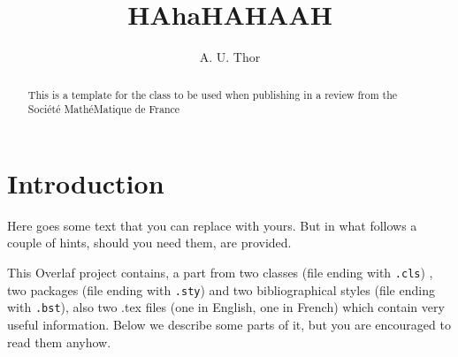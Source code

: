 \documentclass[11pt,english]{smfart}
\title[FakeModularForm]{HAhaHAHAAH}%
\author[A.T.]{A. U. Thor}%
\theoremstyle{definition}
\theoremstyle{remark}
\begin{document}
\begin{abstract}
This is a template for the class to be used when publishing in a review from the Soci\'et\'e Ma\-th\'e\-Ma\-ti\-que de France
\end{abstract}


\maketitle

\tableofcontents

\section{Introduction}
Here goes some text that you can replace with yours. But in what follows a couple of hints, should you need them, are provided.

This Overlaf project contains, a part from two classes (file ending with \texttt{.cls}) , two packages (file ending with \texttt{.sty}) and two bibliographical styles (file ending with \texttt{.bst}), also two .tex files (one in English, one in French) which contain very useful information. Below we describe some parts of it, but you are encouraged to read them anyhow.
\end{document}
